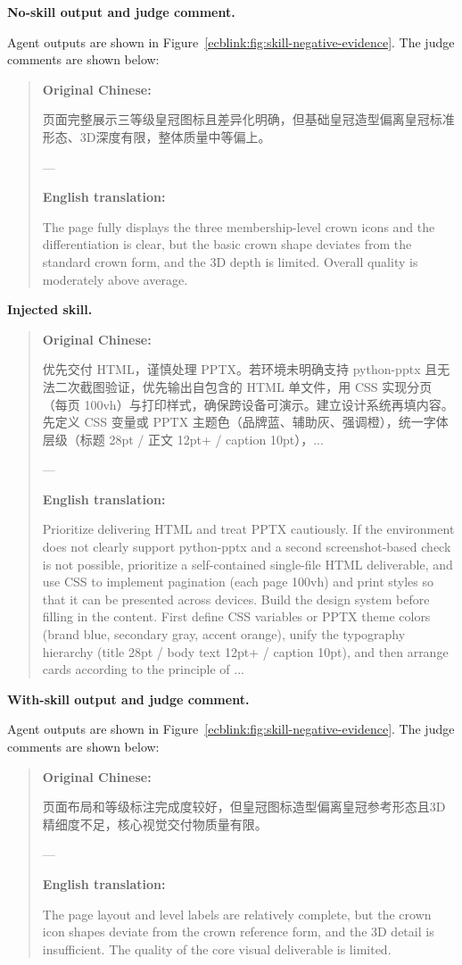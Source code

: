 \documentclass[11pt, a4paper, copyright, frontis]{frontis}
\newcommand{\caseheader}[1]{\noindent\colorbox{fbcaseblue}{\parbox{0.96\linewidth}{\color{white}\bfseries #1}}\vspace{0.5mm}\newline}
\newenvironment{casebox}{%
  \begin{quote}%
  \setlength{\parindent}{0pt}%
  \setlength{\parskip}{0pt}%
}{%
  \end{quote}%
}
\begin{document}
\caseheader{No-skill output and judge comment.}
Agent outputs are shown in Figure~\ref{ecblink:fig:skill-negative-evidence}. The judge comments are shown below:

\begin{casebox}\scriptsize\raggedright
\textbf{Original Chinese:}

页面完整展示三等级皇冠图标且差异化明确，但基础皇冠造型偏离皇冠标准形态、3D深度有限，整体质量中等偏上。

---

\textbf{English translation:}

The page fully displays the three membership-level crown icons and the differentiation is clear, but the basic crown shape deviates from the standard crown form, and the 3D depth is limited. Overall quality is moderately above average.
\end{casebox}

\caseheader{Injected skill.}
\begin{casebox}\scriptsize\raggedright
\textbf{Original Chinese:}

优先交付 HTML，谨慎处理 PPTX。若环境未明确支持 python-pptx 且无法二次截图验证，优先输出自包含的 HTML 单文件，用 CSS 实现分页（每页 100vh）与打印样式，确保跨设备可演示。建立设计系统再填内容。先定义 CSS 变量或 PPTX 主题色（品牌蓝、辅助灰、强调橙），统一字体层级（标题 28pt / 正文 12pt+ / caption 10pt），...

---

\textbf{English translation:}

Prioritize delivering HTML and treat PPTX cautiously. If the environment does not clearly support python-pptx and a second screenshot-based check is not possible, prioritize a self-contained single-file HTML deliverable, and use CSS to implement pagination (each page 100vh) and print styles so that it can be presented across devices. Build the design system before filling in the content. First define CSS variables or PPTX theme colors (brand blue, secondary gray, accent orange), unify the typography hierarchy (title 28pt / body text 12pt+ / caption 10pt), and then arrange cards according to the principle of ...
\end{casebox}

\caseheader{With-skill output and judge comment.}
Agent outputs are shown in Figure~\ref{ecblink:fig:skill-negative-evidence}. The judge comments are shown below:
\begin{casebox}\scriptsize\raggedright
\textbf{Original Chinese:}

页面布局和等级标注完成度较好，但皇冠图标造型偏离皇冠参考形态且3D精细度不足，核心视觉交付物质量有限。

---

\textbf{English translation:}

The page layout and level labels are relatively complete, but the crown icon shapes deviate from the crown reference form, and the 3D detail is insufficient. The quality of the core visual deliverable is limited.
\end{casebox}
\end{document}
